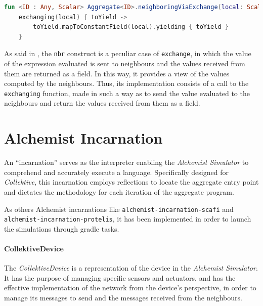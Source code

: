 \begin{lstlisting}[language=kt,label={lst:neighboringViaExchange},caption={The implementation of the \texttt{neighboringViaExchange} function.}]
fun <ID : Any, Scalar> Aggregate<ID>.neighboringViaExchange(local: Scalar): Field<ID, Scalar> =
    exchanging(local) { toYield ->
        toYield.mapToConstantField(local).yielding { toYield }
    }
\end{lstlisting}

As said in , the \texttt{nbr} construct is a peculiar case of \texttt{exchange}, in which
the value of the expression evaluated is sent to neighbours and the values received from them are returned as a field.
In this way, it provides a view of the values computed by the neighbours.
Thus, its implementation consists of a call to the \texttt{exchanging} function, made in such a way as to send the value
evaluated to the neighbours and return the values received from them as a field.

\section{Alchemist Incarnation}
\label{sec:incarnation}
An ``incarnation'' serves as the interpreter enabling the \emph{Alchemist Simulator} to comprehend and accurately execute a language.
Specifically designed for \emph{Collektive}, this incarnation employs reflections to locate the aggregate entry point and dictates
the methodology for each iteration of the aggregate program.

As others Alchemist incarnations like \texttt{alchemist-incarnation-scafi} and \\ \texttt{alchemist-incarnation-protelis},
it has been implemented in order to launch the simulations through gradle tasks.


\paragraph{CollektiveDevice}
The \emph{CollektiveDevice} is a representation of the device in the \emph{Alchemist Simulator}.
It has the purpose of managing specific sensors and actuators, and has the effective implementation of the network from the
device's perspective, in order to manage its messages to send and the messages received from the neighbours.

